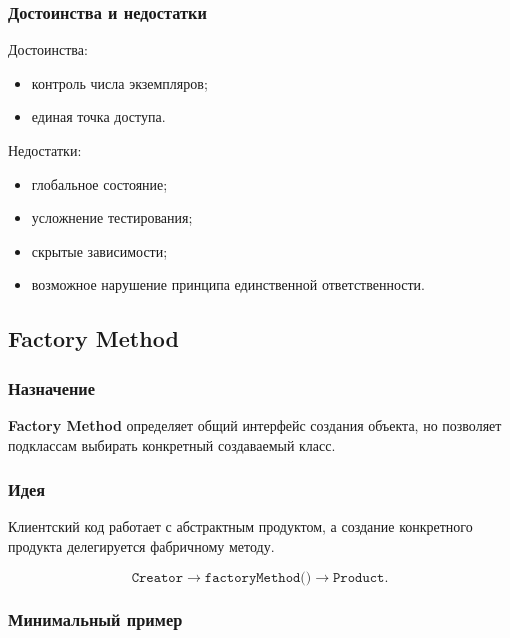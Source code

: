 \documentclass[12pt,a4paper]{article}
\begin{document}
\subsubsection{Достоинства и недостатки}

Достоинства:
\begin{itemize}
    \item контроль числа экземпляров;
    \item единая точка доступа.
\end{itemize}

Недостатки:
\begin{itemize}
    \item глобальное состояние;
    \item усложнение тестирования;
    \item скрытые зависимости;
    \item возможное нарушение принципа единственной ответственности.
\end{itemize}

\subsection{Factory Method}

\subsubsection{Назначение}

\textbf{Factory Method} определяет общий интерфейс создания объекта, но позволяет подклассам выбирать конкретный создаваемый класс.

\subsubsection{Идея}

Клиентский код работает с абстрактным продуктом, а создание конкретного продукта делегируется фабричному методу.

\[
\texttt{Creator} \rightarrow \texttt{factoryMethod()} \rightarrow \texttt{Product}.
\]

\subsubsection{Минимальный пример}
\end{document}
